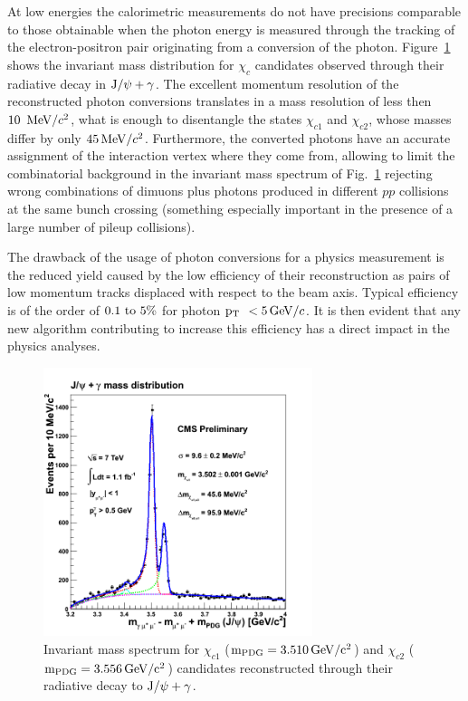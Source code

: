 \documentclass[a4paper]{jpconf}
\def \Chione {\chi_{c1}}
\def \Chitwo {\chi_{c2}}
\def \JPsi{\rm J/\psi}
\def \cPgg{\gamma}
\def \pt{$\p_{\rm T}$~}
\begin{document}
At  low energies %
the calorimetric
measurements do not have precisions comparable to those obtainable
when the photon energy is measured through the tracking of the 
electron-positron pair originating from a conversion of the photon.
Figure~\ref{fig:chic} shows the invariant mass distribution for $\chi_c$ candidates
observed through their radiative decay in $\JPsi + \cPgg$. The excellent momentum resolution of the reconstructed photon conversions translates in a mass resolution of less then $10~{\rm \, MeV}/c^2$, what is enough to disentangle  the states $\Chione$ and $\Chitwo$, whose masses differ by only $45{\rm \, MeV}/c^2$.
%
Furthermore, the  converted photons have an accurate assignment of the interaction vertex where they come from, allowing  to limit the combinatorial background in the invariant mass spectrum of Fig.~\ref{fig:chic}
rejecting wrong combinations of  dimuons  plus  photons produced in different $pp$ collisions at the same bunch crossing (something especially important in the
presence of a large number of pileup collisions). 


The drawback of the usage of photon conversions for a physics measurement 
is the reduced yield caused by the low efficiency of their reconstruction as pairs of low momentum tracks displaced with respect to the beam axis. Typical efficiency is of the order of $\rm 0.1 ~to~ 5\%$ for photon \pt  $< 5 {\rm \, GeV}/c$. It is then evident that any new algorithm contributing to increase this efficiency has a direct impact in the physics analyses.





\begin{figure}[h]
  \begin{center}
    \includegraphics[width=0.7\textwidth]{fig/Chic1fb.png}
   \caption{    \label{fig:chic}
Invariant mass spectrum for $\chi_{c1}$ ($\rm m_{PDG} = 3.510{\rm \, GeV}/c^2$) and $\chi_{c2}$ ($\rm m_{PDG} = 3.556{\rm \, GeV}/c^2$)  candidates  reconstructed through their radiative decay to $\JPsi + \cPgg$.}
     \end{center}
\end{figure} 
\end{document}
